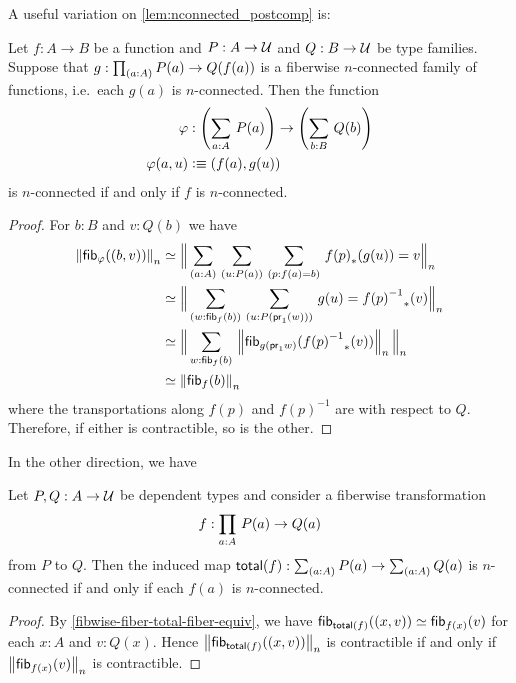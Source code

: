 A useful variation on \autoref{lem:nconnected_postcomp} is:

\begin{lem}\label{lem:nconnected_postcomp_variation}
Let $f:A\to B$ be a function and $P:A\to\type$ and $Q:B\to\type$ be type families. Suppose that $g:\prd{a:A} P(a)\to Q(f(a))$
is a fiberwise $n$-connected family of functions, i.e.\ each $g(a)$ is $n$-connected. Then the function
\begin{align*}
\varphi &:\left(\sm{a:A} P(a)\right)\to\left(\sm{b:B} Q(b)\right)\\
\varphi(a,u) &\defeq \pairr{f(a),g(u)}
\end{align*}
is $n$-connected if and only if $f$ is $n$-connected.
\end{lem}

\begin{proof}
For $b:B$ and $v:Q(b)$ we have
\begin{align*}
\trunc n{\hfib{\varphi}{\pairr{b,v}}} & \simeq \Trunc n{\sm{a:A}{u:P(a)}{p:f(a)= b} \trans{f(p)}{g(u)}= v}\\
& \simeq \Trunc n{\sm{w:\hfib{f}b}{u:P(\proj1(w))} g(u)= \trans{\opp{f(p)}}{v}}\\
& \simeq \Trunc n{\sm{w:\hfib{f}b} \trunc n{\hfib{g(\proj1 w)}{\trans{\opp{f(p)}}{v}}}}\\
& \simeq \trunc n{\hfib{f}b}
\end{align*}
where the transportations along $f(p)$ and $f(p)^{-1}$ are with respect to $Q$.
Therefore, if either is contractible, so is the other.
\end{proof}

In the other direction, we have

\begin{lem}\label{prop:nconn_fiber_to_total}
Let $P,Q:A\to\type$ be dependent types and consider a fiberwise transformation
\begin{equation*}
f:\prd{a:A} P(a)\to Q(a)
\end{equation*}
from $P$ to $Q$. Then the induced map $\total f: \sm{a:A}P(a) \to \sm{a:A} Q(a)$ is $n$-connected if and only if each $f(a)$ is $n$-connected. 
\end{lem}

\begin{proof}
By \autoref{fibwise-fiber-total-fiber-equiv}, we have
$\hfib{\total f}{\pairr{x,v}}\simeq\hfib{f(x)}v$
for each $x:A$ and $v:Q(x)$. Hence $\trunc n{\hfib{\total f}{\pairr{x,v}}}$ is contractible if and only if
$\trunc n{\hfib{f(x)}v}$ is contractible.
\end{proof}

